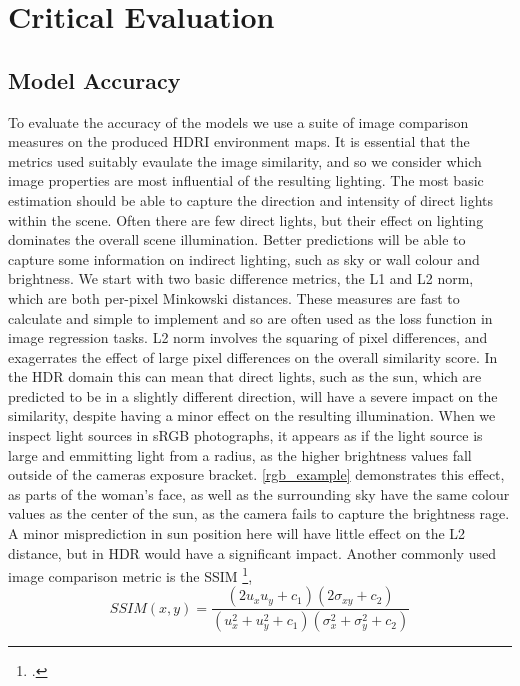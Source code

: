 \documentclass[ %
                    author={Gavin Parker},
                supervisor={Dr. Neill Campbell},
                    degree={MEng},
                     title={Deep Siamese Networks for Illumination Estimation from Stereo Images},
                  subtitle={},
                      type={research},
                      year={2018} ]{dissertation}
\begin{document}
\chapter{Critical Evaluation}
\label{chap:evaluation}

\section{Model Accuracy}
To evaluate the accuracy of the models we use a suite of image comparison measures on the produced HDRI environment maps. It is essential that the metrics used suitably evaulate the image similarity, and so we consider which image properties are most influential of the resulting lighting. The most basic estimation should be able to capture the direction and intensity of direct lights within the scene. Often there are few direct lights, but their effect on lighting dominates the overall scene illumination. Better predictions will be able to capture some information on indirect lighting, such as sky or wall colour and brightness.
\newline 
We start with two basic difference metrics, the L1 and L2 norm, which are both per-pixel Minkowski distances. These measures are fast to calculate and simple to implement and so are often used as the loss function in image regression tasks. L2 norm involves the squaring of pixel differences, and exagerrates the effect of large pixel differences on the overall similarity score. In the HDR domain this can mean that direct lights, such as the sun, which are predicted to be in a slightly different direction, will have a severe impact on the similarity, despite having a minor effect on the resulting illumination. When we inspect light sources in sRGB photographs, it appears as if the light source is large and emmitting light from a radius, as the higher brightness values fall outside of the cameras exposure bracket. \ref{rgb_example} demonstrates this effect, as parts of the woman's face, as well as the surrounding sky have the same colour values as the center of the sun, as the camera fails to capture the brightness rage. A minor misprediction in sun position here will have little effect on the L2 distance, but in HDR would have a significant impact.
\newline
Another commonly used image comparison metric is the SSIM \footcite{http://ieeexplore.ieee.org/stamp/stamp.jsp?tp=&arnumber=1284395},
\[SSIM(x,y) = \frac{(2u_xu_y + c_1)(2\sigma_{xy} + c_2)}{(u^2_x + u^2_y + c_1)(\sigma^2_x + \sigma^2_y + c_2)}\]
\end{document}

